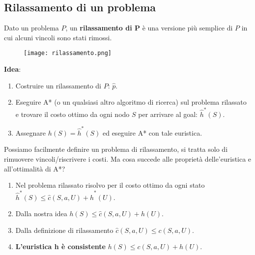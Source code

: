 \documentclass{article}
\begin{document}
\subsection{Rilassamento di un problema}
Dato un problema $P$, un \textbf{rilassamento di P} è una versione più semplice di $P$ in cui alcuni vincoli sono stati rimossi.
\begin{figure} [H]
  \centering\texttt{[image: rilassamento.png]}
\end{figure}
\textbf{Idea}:
\begin{enumerate}
    \item Costruire un rilassamento di $P$: $\hat{p}$.
    \item Eseguire A* (o un qualsiasi altro algoritmo di ricerca) sul problema rilassato e trovare il costo ottimo da ogni nodo $S$ per arrivare al goal: $\hat{h}^*(S)$.
    \item Assegnare $h(S) = \hat{h}^*(S)$ ed eseguire A* con tale euristica.
\end{enumerate}
Possiamo facilmente definire un problema di rilassamento, si tratta solo di rimuovere vincoli/riscrivere i costi. Ma cosa succede alle proprietà delle'euristica e all'ottimalità di A*?
\begin{enumerate}
    \item Nel problema rilassato risolvo per il costo ottimo da ogni stato $\hat{h}^*(S) \leq \hat{c}(S,a,U) + \hat{h}^*(U)$.
    \item Dalla nostra idea $h(S)\leq \hat{c}(S,a,U)+h(U)$.
    \item Dalla definizione di rilassamento $\hat{c}(S,a,U) \leq c(S,a,U)$.
    \item \textbf{L'euristica h è consistente} $h(S)\leq c(S,a,U)+h(U)$.
\end{enumerate}
\end{document}
